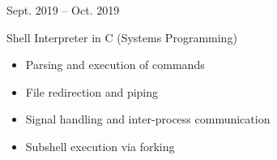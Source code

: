 \documentclass[a4paper]{article}
\newlength{\cvcolumngapwidth}
\newlength{\cvleftcolumnwidth}
\newlength{\cvrightcolumnwidth}
\newcommand{\cvtitlestyle}[1]{{\large\cvtitlefont\textcolor{cvtitlecolor}{#1}}}
\newcommand{\cvdurationstyle}[1]{{\small\cvdurationfont\textcolor{cvdurationcolor}{#1}}}
\newlength{\cvafteritemskipamount}
\newlength{\cvaftertitleskipamount}
\newlength{\cvparskip}
\newcommand{\cvitem}[2]{
    \begin{minipage}[t]{\cvleftcolumnwidth}
        \raggedleft #1
    \end{minipage}%
    \hspace{\cvcolumngapwidth}%
    \begin{minipage}[t]{\cvrightcolumnwidth}
        \setlength{\parskip}{\cvparskip} #2
    \end{minipage}

    \vspace{\cvafteritemskipamount}
}
\newcommand{\cvtitle}[1]{
    \cvtitlestyle{#1}

    \vspace{\cvaftertitleskipamount}
    \vspace{-\cvparskip}
}
\begin{document}
\cvitem{
    \cvdurationstyle{Sept. 2019 -- Oct. 2019}
}{
  \cvtitle{Shell Interpreter in C (Systems Programming)}

    \begin{itemize}[leftmargin=*]
        \item Parsing and execution of commands
        \item File redirection and piping
        \item Signal handling and inter-process communication
        \item Subshell execution via forking
    \end{itemize}
}
\end{document}
